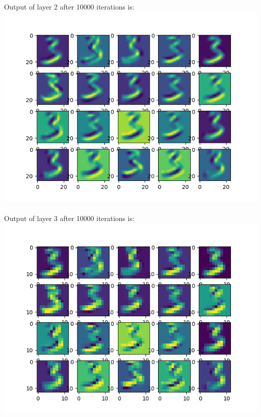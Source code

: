 \documentclass[fleqn]{article}
\begin{document}
\section{}
\begin{adjustwidth}{4em}{0pt}
	Output of layer 2 after 10000 iterations is: \\
	\includegraphics[scale = 1]{output2_10000_iterations.png}\\ \\
	Output of layer 3 after 10000 iterations is: \\	
	\includegraphics[scale = 1]{output3_10000_iterations.png}\\ \\	
\end{adjustwidth}
\end{document}
